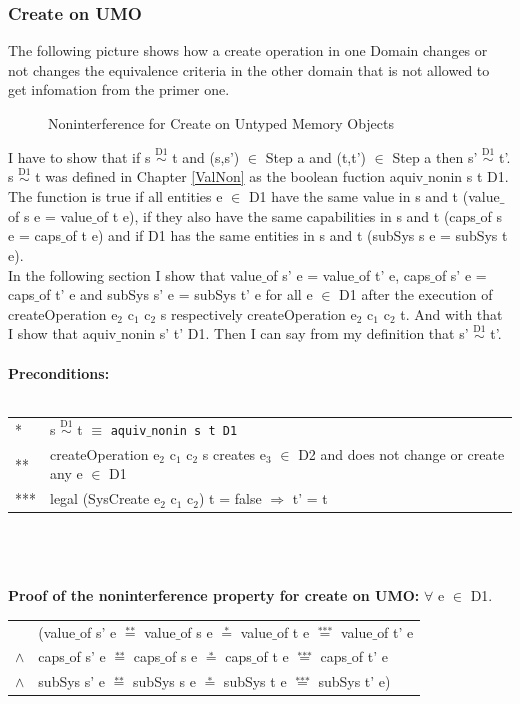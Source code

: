 \documentclass[pdftex,11pt,a4paper,twoside]{article}
\begin{document}
\subsubsection{Create on UMO}
The following picture shows how a create operation in one Domain changes or not changes the equivalence criteria in the other domain that is not allowed to get infomation from the primer one.
\begin{flushleft}
\begin{figure}[H]
\caption{Noninterference for Create on Untyped Memory Objects}
\end{figure}
\end{flushleft}
I have to show that if s $\overset{\text{D1}}{\sim}$ t and (s,s') $\in$ Step a and (t,t') $\in$ Step a then s' $\overset{\text{D1}}{\sim}$ t'. 
s $\overset{\text{D1}}{\sim}$ t was defined in Chapter \ref{ValNon} as the boolean fuction aquiv$\_$nonin s t D1. The function is true if all entities e $\in$ D1 have the same value in s and t (value$\_$of s e = value$\_$of t e), if they also have the same capabilities in s and t (caps$\_$of s e = caps$\_$of t e) and if D1 has the same entities in s and t (subSys s e = subSys t e).\\
In the following section I show that value$\_$of s' e = value$\_$of t' e, caps$\_$of s' e = caps$\_$of t’ e and subSys s' e = subSys t' e for all e $\in$ D1 after the execution of 
createOperation e$_2$ c$_1$ c$_2$ s respectively createOperation e$_2$ c$_1$ c$_2$ t. And with that I show that aquiv$\_$nonin s' t' D1. Then I can say from my definition that s' $\overset{\text{D1}}{\sim}$ t'. \\ \\
\textbf{Preconditions:} \\ \\
\begin{tabular}{ll}
* & s $\overset{\text{D1}}{\sim}$ t $\equiv$ \texttt{aquiv$\_$nonin s t D1}	\\ 
** & createOperation e$_2$ c$_1$ c$_2$ s creates e$_3$ $\in$ D2 and does not change or create any e $\in$ D1 \\
*** & legal (SysCreate e$_2$ c$_1$ c$_2$) t = false $\Rightarrow$ t' = t
\end{tabular}\\ \\ \\
\textbf{Proof of the noninterference property for create on UMO:}
$\forall$ e $\in$ D1. \\ 
\begin{tabular}{ll}
& (value$\_$of s' e $\overset{\text{**}}{=}$ value$\_$of s e $\overset{\text{*}}{=}$ value$\_$of t e $\overset{\text{***}}{=}$ value$\_$of t' e \\
$\wedge$ & caps$\_$of s' e $\overset{\text{**}}{=}$ caps$\_$of s e $\overset{\text{*}}{=}$ caps$\_$of t e $\overset{\text{***}}{=}$ caps$\_$of t' e \\
$\wedge$ & subSys s' e $\overset{\text{**}}{=}$ subSys s e $\overset{\text{*}}{=}$ subSys t e $\overset{\text{***}}{=}$ subSys t' e)
\end{tabular} \\
\end{document}
